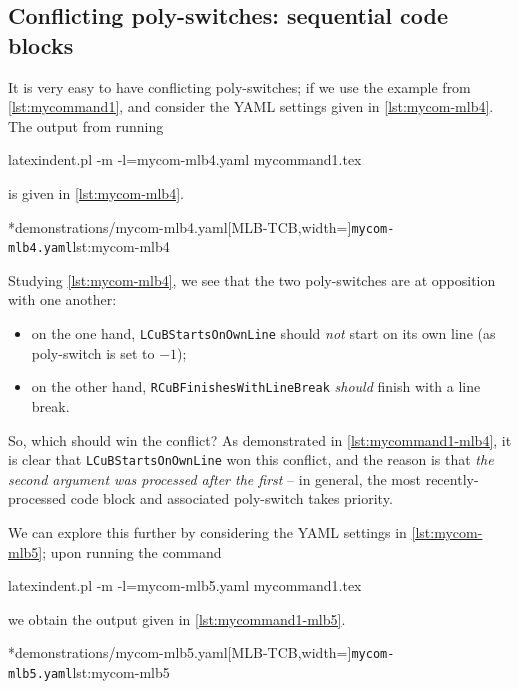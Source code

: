 \subsection{Conflicting poly-switches: sequential code blocks}
	It is very easy to have conflicting poly-switches; if we use the example from \vref{lst:mycommand1},
	and consider the YAML settings given in \cref{lst:mycom-mlb4}. The output from running
	\begin{commandshell}
latexindent.pl -m -l=mycom-mlb4.yaml mycommand1.tex
\end{commandshell}
	is given in \cref{lst:mycom-mlb4}.

	\begin{minipage}{.4\linewidth}
	\end{minipage}
	\hfill
	\begin{minipage}{.55\linewidth}
		\cmhlistingsfromfile[style=yaml-LST]*{demonstrations/mycom-mlb4.yaml}[MLB-TCB,width=\linewidth]{\texttt{mycom-mlb4.yaml}}{lst:mycom-mlb4}
	\end{minipage}

	Studying \cref{lst:mycom-mlb4}, we see that the two poly-switches are at opposition with one another:
	\begin{itemize}
		\item on the one hand, \texttt{LCuBStartsOnOwnLine} should \emph{not} start on its own line (as poly-switch is set to $-1$);
		\item on the other hand, \texttt{RCuBFinishesWithLineBreak} \emph{should} finish with a line break.
	\end{itemize}
	So, which should win the conflict? As demonstrated in \cref{lst:mycommand1-mlb4}, it is clear that \texttt{LCuBStartsOnOwnLine} won
	this conflict, and the reason is that \emph{the second argument was processed after the first} -- in general, the most recently-processed
	code block and associated poly-switch takes priority.

	We can explore this further by considering the YAML settings in \cref{lst:mycom-mlb5}; upon running the command
	\begin{commandshell}
latexindent.pl -m -l=mycom-mlb5.yaml mycommand1.tex
\end{commandshell}
	we obtain the output given in \cref{lst:mycommand1-mlb5}.

	\begin{minipage}{.4\linewidth}
	\end{minipage}
	\hfill
	\begin{minipage}{.55\linewidth}
		\cmhlistingsfromfile[style=yaml-LST]*{demonstrations/mycom-mlb5.yaml}[MLB-TCB,width=\linewidth]{\texttt{mycom-mlb5.yaml}}{lst:mycom-mlb5}
	\end{minipage}

